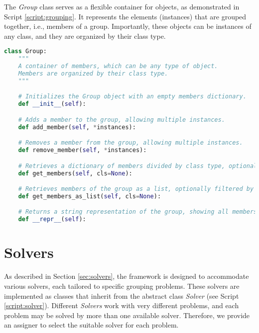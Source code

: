     The \textit{Group} class serves as a flexible container for objects, as demonstrated in Script \ref{script:grouping}. It represents the elements (instances) that are grouped together, i.e., members of a group. Importantly, these objects can be instances of any class, and they are organized by their class type.

    \begin{lstlisting}[language=Python, caption={\textit{Group} Class. It represents the elements (instances) that are grouped together.}, label={script:grouping}]
class Group:
    """
    A container of members, which can be any type of object.
    Members are organized by their class type.
    """

    # Initializes the Group object with an empty members dictionary.
    def __init__(self):

    # Adds a member to the group, allowing multiple instances.
    def add_member(self, *instances):

    # Removes a member from the group, allowing multiple instances.
    def remove_member(self, *instances):

    # Retrieves a dictionary of members divided by class type, optionally filtered by only one class type.
    def get_members(self, cls=None):

    # Retrieves members of the group as a list, optionally filtered by class type.
    def get_members_as_list(self, cls=None):

    # Returns a string representation of the group, showing all members and their types.
    def __repr__(self):
    \end{lstlisting}

    \section{Solvers}
        As described in Section \ref{sec:solvers}, the framework is designed to accommodate various solvers, each tailored to specific grouping problems. These solvers are implemented as classes that inherit from the abstract class \textit{Solver} (see Script \ref{script:solver}).
        Different \textit{Solvers} work with very different problems, and each problem may be solved by more than one available solver.
        Therefore, we provide an assigner to select the suitable solver for each problem.

